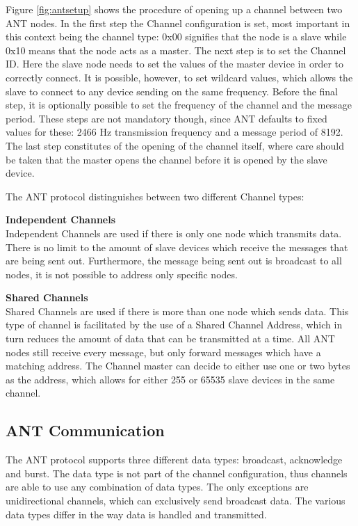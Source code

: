 Figure \ref{fig:antsetup} shows the procedure of opening up a channel between two ANT nodes. In the first step the Channel configuration is set, most important in this context being the channel type: 0x00 signifies that the node is a slave while 0x10 means that the node acts as a master. The next step is to set the Channel ID. Here the slave node needs to set the values of the master device in order to correctly connect. It is possible, however, to set wildcard values, which allows the slave to connect to any device sending on the same frequency. Before the final step, it is optionally possible to set the frequency of the channel and the message period. These steps are not mandatory though, since ANT defaults to fixed values for these: 2466 Hz transmission frequency and a message period of 8192. The last step constitutes of the opening of the channel itself, where care should be taken that the master opens the channel before it is opened by the slave device.

The ANT protocol distinguishes between two different Channel types:
\begin{description}
	\item{\textbf{Independent Channels}} \hfill \\ Independent Channels are used if there is only one node which transmits  data. There is no limit to the amount of slave devices which receive the messages that are being sent out. Furthermore, the message being sent out is broadcast to all nodes, it is not possible to address only specific nodes.
	\item{\textbf{Shared Channels}} \hfill \\ Shared Channels are used if there is more than one node which sends data. This type of channel is facilitated by the use of a Shared Channel Address, which in turn reduces the amount of data that can be transmitted at a time. All ANT nodes still receive every message, but only forward messages which have a matching address. The Channel master can decide to either use one or two bytes as the address, which allows for either 255 or 65535 slave devices in the same channel. 
\end{description}

\subsection{ANT Communication}

The ANT protocol supports three different data types: broadcast, acknowledge and burst. The data type is not part of the channel configuration, thus channels are able to use any combination of data types. The only exceptions are unidirectional channels, which can exclusively send broadcast data. The various data types differ in the way data is handled and transmitted.

